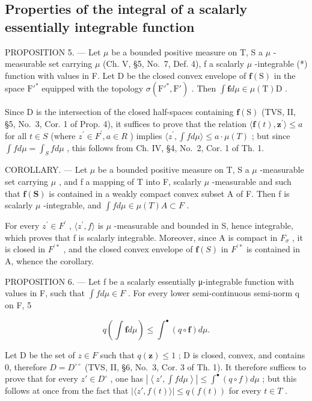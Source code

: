 \subsection{Properties of the integral of a scalarly essentially integrable function}

PROPOSITION 5. --- Let \(\mu\) be a bounded positive measure on T, S a \(\mu\) -measurable set carrying \(\mu\) (Ch. V, §5, No.~7, Def. 4), f a scalarly \(\mu\) -integrable (*) function with values in F. Let D be the closed convex envelope of \(\mathbf{f}(\mathrm{S})\) in the space \(\mathrm{F}'^*\) equipped with the topology \(\sigma(\mathrm{F}'^*, \mathrm{F}')\) . Then \(\int \mathbf{f} d\mu \in \mu(\mathrm{T})\mathrm{D}\) .

Since D is the intersection of the closed half-spaces containing \(\mathbf{f}(\mathrm{S})\) (TVS, II, §5, No.~3, Cor. 1 of Prop. 4), it suffices to prove that the relation \(\langle\mathbf{f}(t),\mathbf{z}^{\prime}\rangle\leqslant a\) for all \(t\in S\) (where \(z^{\prime}\in F^{\prime},a\in R\) ) implies \(\langle z^{\prime},\int f d\mu\rangle\leqslant a\cdot\mu(T)\) ; but since \(\int f d\mu=\int_{S}f d\mu\) , this follows from Ch. IV, §4, No.~2, Cor. 1 of Th. 1.

COROLLARY. --- Let \(\mu\) be a bounded positive measure on T, S a \(\mu\) -measurable set carrying \(\mu\) , and f a mapping of T into F, scalarly \(\mu\) -measurable and such that \(\mathbf{f}(\mathbf{S})\) is contained in a weakly compact convex subset A of F. Then f is scalarly \(\mu\) -integrable, and \(\int f d\mu \in \mu(T)A \subset F\) .

For every \(z^{\prime} \in F^{\prime}\) , \(\langle z^{\prime}, f \rangle\) is \(\mu\) -measurable and bounded in S, hence integrable, which proves that f is scalarly integrable. Moreover, since A is compact in \(F_{\sigma}\) , it is closed in \(F^{\prime*}\) , and the closed convex envelope of \(\mathbf{f}(S)\) in \(F^{\prime*}\) is contained in A, whence the corollary.

PROPOSITION 6. --- Let f be a scalarly essentially μ-integrable function with values in F, such that \(\int f d\mu \in F\) . For every lower semi-continuous semi-norm q on F, 5

\[
q \left(\int \mathbf {f} d \mu\right) \leqslant \int^ {\bullet} (q \circ \mathbf {f}) d \mu .
\]

Let D be the set of \(z \in F\) such that \(q(\mathbf{z}) \leqslant 1\) ; D is closed, convex, and contains 0, therefore \(D = D^{\circ\circ}\) (TVS, II, §6, No.~3, Cor. 3 of Th. 1). It therefore suffices to prove that for every \(z' \in D^{\circ}\) , one has \(\left|\left\langle z', \int f d\mu \right\rangle\right| \leqslant \int^{\bullet}(q \circ f) d\mu\) ; but this follows at once from the fact that \(|\langle z', f(t) \rangle| \leqslant q(f(t))\) for every \(t \in T\) .

